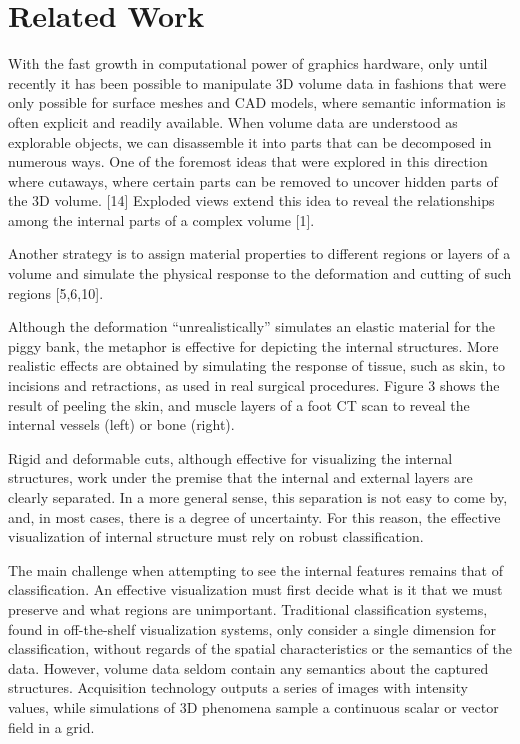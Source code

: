 \section{Related Work}

With the fast growth in computational power of graphics hardware, only until recently it has been possible to manipulate 3D volume data in fashions that were only possible for surface meshes and CAD models, where semantic information is often explicit and readily available. When volume data are understood as explorable objects, we can disassemble it into parts that can be decomposed in numerous ways. One of the foremost ideas that were explored in this direction where cutaways, where certain parts can be removed to uncover hidden parts of the 3D volume. [14] Exploded views extend this idea to reveal the relationships among the internal parts of a complex volume [1].

Another strategy is to assign material properties to different regions or layers of a volume and simulate the physical response to the deformation and cutting of such regions [5,6,10]. 

Although the deformation “unrealistically” simulates an elastic material for the piggy bank, the metaphor is effective for depicting the internal structures. More realistic effects are obtained by simulating the response of tissue, such as skin, to incisions and retractions, as used in real surgical procedures. Figure 3 shows the result of peeling the skin, and muscle layers of a foot CT scan to reveal the internal vessels (left) or bone (right).

Rigid and deformable cuts, although effective for visualizing the internal structures, work under the premise that the internal and external layers are clearly separated. In a more general sense, this separation is not easy to come by, and, in most cases, there is a degree of uncertainty. For this reason, the effective visualization of internal structure must rely on robust classification.

The main challenge when attempting to see the internal features remains that of classification. An effective visualization must first decide what is it that we must preserve and what regions are unimportant. Traditional classification systems, found in off-the-shelf visualization systems, only consider a single dimension for classification, without regards of the spatial characteristics or the semantics of the data. However, volume data seldom contain any semantics about the captured structures. Acquisition technology outputs a series of images with intensity values, while simulations of 3D phenomena sample a continuous scalar or vector field in a grid.


